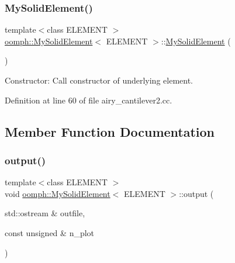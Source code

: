 \subsubsection{\texorpdfstring{My\+Solid\+Element()}{MySolidElement()}\hspace{0.1cm}{\footnotesize\ttfamily [2/2]}}
{\footnotesize\ttfamily template$<$class E\+L\+E\+M\+E\+NT $>$ \\
\hyperlink{classoomph_1_1MySolidElement}{oomph\+::\+My\+Solid\+Element}$<$ E\+L\+E\+M\+E\+NT $>$\+::\hyperlink{classoomph_1_1MySolidElement}{My\+Solid\+Element} (\begin{DoxyParamCaption}{ }\end{DoxyParamCaption})\hspace{0.3cm}{\ttfamily [inline]}}



Constructor\+: Call constructor of underlying element. 



Definition at line 60 of file airy\+\_\+cantilever2.\+cc.



\subsection{Member Function Documentation}
\mbox{\label{classoomph_1_1MySolidElement_abf5b903419201b1fd6f1587749337650}} 
\subsubsection{\texorpdfstring{output()}{output()}\hspace{0.1cm}{\footnotesize\ttfamily [1/2]}}
{\footnotesize\ttfamily template$<$class E\+L\+E\+M\+E\+NT $>$ \\
void \hyperlink{classoomph_1_1MySolidElement}{oomph\+::\+My\+Solid\+Element}$<$ E\+L\+E\+M\+E\+NT $>$\+::output (\begin{DoxyParamCaption}\item[{std\+::ostream \&}]{outfile,  }\item[{const unsigned \&}]{n\+\_\+plot }\end{DoxyParamCaption})\hspace{0.3cm}{\ttfamily [inline]}}




